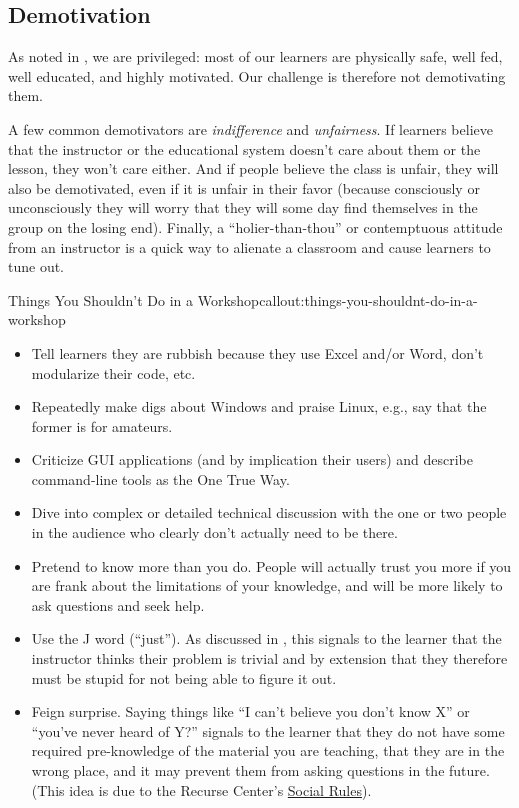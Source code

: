 \subsection{Demotivation}\label{demotivation}

As noted in , we are privileged: most of our learners are physically
safe, well fed, well educated, and highly motivated. Our challenge is
therefore not demotivating them.

A few common demotivators are \emph{indifference} and \emph{unfairness}.
If learners believe that the instructor or the educational system
doesn't care about them or the lesson, they won't care either. And if
people believe the class is unfair, they will also be demotivated, even
if it is unfair in their favor (because consciously or unconsciously
they will worry that they will some day find themselves in the group on
the losing end). Finally, a ``holier-than-thou'' or contemptuous
attitude from an instructor is a quick way to alienate a classroom and
cause learners to tune out.

\begin{callout}{Things You Shouldn't Do in a Workshop}{callout:things-you-shouldnt-do-in-a-workshop}

\begin{itemize}
\item
  Tell learners they are rubbish because they use Excel and/or Word,
  don't modularize their code, etc.
\item
  Repeatedly make digs about Windows and praise Linux, e.g., say that
  the former is for amateurs.
\item
  Criticize GUI applications (and by implication their users) and
  describe command-line tools as the One True Way.
\item
  Dive into complex or detailed technical discussion with the one or two
  people in the audience who clearly don't actually need to be there.
\item
  Pretend to know more than you do. People will actually trust you more
  if you are frank about the limitations of your knowledge, and will be
  more likely to ask questions and seek help.
\item
  Use the J word (``just''). As discussed in , this
  signals to the learner that the instructor thinks their problem is
  trivial and by extension that they therefore must be stupid for not
  being able to figure it out.
\item
  Feign surprise. Saying things like ``I can't believe you don't know
  X'' or ``you've never heard of Y?'' signals to the learner that they
  do not have some required pre-knowledge of the material you are
  teaching, that they are in the wrong place, and it may prevent them
  from asking questions in the future. (This idea is due to the Recurse
  Center's \href{https://www.recurse.com/manual\#sec-environment}{Social
  Rules}).
\end{itemize}
\end{callout}

